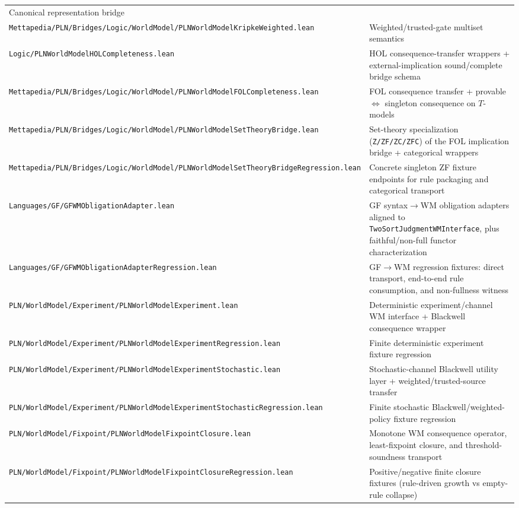 \documentclass[]{article}
\newcommand{\code}[1]{\texttt{#1}}
\begin{document}
\begin{longtable}{p{}p{}}
  Canonical representation bridge \\
\code{Mettapedia/PLN/Bridges/Logic/WorldModel/PLNWorldModelKripkeWeighted.lean} &
  Weighted/trusted-gate multiset semantics \\
\code{Logic/PLNWorldModelHOLCompleteness.lean} &
  HOL consequence-transfer wrappers +
  external-implication sound/complete bridge schema \\
\code{Mettapedia/PLN/Bridges/Logic/WorldModel/PLNWorldModelFOLCompleteness.lean} &
  FOL consequence transfer +
  provable $\Leftrightarrow$ singleton consequence on $T$-models \\
\code{Mettapedia/PLN/Bridges/Logic/WorldModel/PLNWorldModelSetTheoryBridge.lean} &
  Set-theory specialization (\code{Z/ZF/ZC/ZFC}) of the FOL
  implication bridge + categorical wrappers \\
\code{Mettapedia/PLN/Bridges/Logic/WorldModel/PLNWorldModelSetTheoryBridgeRegression.lean} &
  Concrete singleton ZF fixture endpoints for rule packaging
  and categorical transport \\
\code{Languages/GF/GFWMObligationAdapter.lean} &
  GF syntax$\rightarrow$WM obligation adapters aligned to
  \code{TwoSortJudgmentWMInterface}, plus
  faithful/non-full functor characterization \\
\code{Languages/GF/GFWMObligationAdapterRegression.lean} &
  GF$\rightarrow$WM regression fixtures: direct transport, end-to-end
  rule consumption, and non-fullness witness \\
\code{PLN/WorldModel/Experiment/PLNWorldModelExperiment.lean} &
  Deterministic experiment/channel WM interface + Blackwell consequence wrapper \\
\code{PLN/WorldModel/Experiment/PLNWorldModelExperimentRegression.lean} &
  Finite deterministic experiment fixture regression \\
\code{PLN/WorldModel/Experiment/PLNWorldModelExperimentStochastic.lean} &
  Stochastic-channel Blackwell utility layer + weighted/trusted-source transfer \\
\code{PLN/WorldModel/Experiment/PLNWorldModelExperimentStochasticRegression.lean} &
  Finite stochastic Blackwell/weighted-policy fixture regression \\
\code{PLN/WorldModel/Fixpoint/PLNWorldModelFixpointClosure.lean} &
  Monotone WM consequence operator, least-fixpoint closure, and
  threshold-soundness transport \\
\code{PLN/WorldModel/Fixpoint/PLNWorldModelFixpointClosureRegression.lean} &
  Positive/negative finite closure fixtures (rule-driven growth vs empty-rule collapse) \\

\end{longtable}
\end{document}
